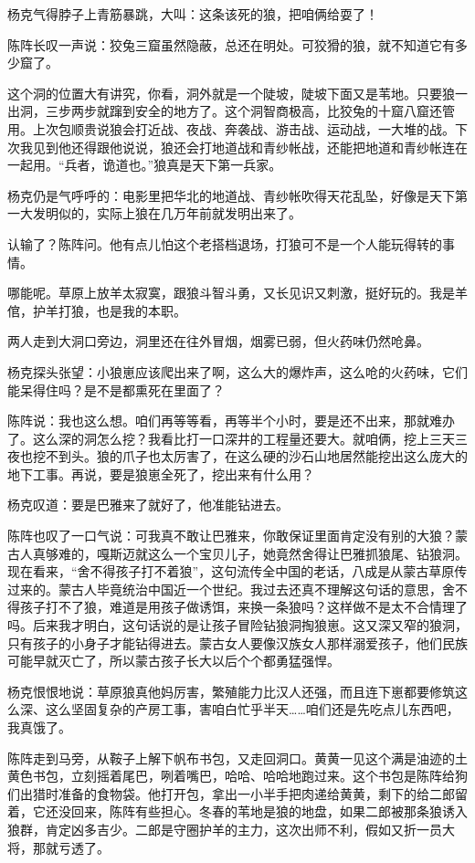 \par 杨克气得脖子上青筋暴跳，大叫：这条该死的狼，把咱俩给耍了！
\par 陈阵长叹一声说：狡兔三窟虽然隐蔽，总还在明处。可狡猾的狼，就不知道它有多少窟了。
\par 这个洞的位置大有讲究，你看，洞外就是一个陡坡，陡坡下面又是苇地。只要狼一出洞，三步两步就蹿到安全的地方了。这个洞智商极高，比狡兔的十窟八窟还管用。上次包顺贵说狼会打近战、夜战、奔袭战、游击战、运动战，一大堆的战。下次我见到他还得跟他说说，狼还会打地道战和青纱帐战，还能把地道和青纱帐连在一起用。“兵者，诡道也。”狼真是天下第一兵家。
\par 杨克仍是气呼呼的：电影里把华北的地道战、青纱帐吹得天花乱坠，好像是天下第一大发明似的，实际上狼在几万年前就发明出来了。
\par 认输了？陈阵问。他有点儿怕这个老搭档退场，打狼可不是一个人能玩得转的事情。
\par 哪能呢。草原上放羊太寂寞，跟狼斗智斗勇，又长见识又刺激，挺好玩的。我是羊倌，护羊打狼，也是我的本职。
\par 两人走到大洞口旁边，洞里还在往外冒烟，烟雾已弱，但火药味仍然呛鼻。
\par 杨克探头张望：小狼崽应该爬出来了啊，这么大的爆炸声，这么呛的火药味，它们能呆得住吗？是不是都熏死在里面了？
\par 陈阵说：我也这么想。咱们再等等看，再等半个小时，要是还不出来，那就难办了。这么深的洞怎么挖？我看比打一口深井的工程量还要大。就咱俩，挖上三天三夜也挖不到头。狼的爪子也太厉害了，在这么硬的沙石山地居然能挖出这么庞大的地下工事。再说，要是狼崽全死了，挖出来有什么用？
\par 杨克叹道：要是巴雅来了就好了，他准能钻进去。
\par 陈阵也叹了一口气说：可我真不敢让巴雅来，你敢保证里面肯定没有别的大狼？蒙古人真够难的，嘎斯迈就这么一个宝贝儿子，她竟然舍得让巴雅抓狼尾、钻狼洞。现在看来，“舍不得孩子打不着狼”，这句流传全中国的老话，八成是从蒙古草原传过来的。蒙古人毕竟统治中国近一个世纪。我过去还真不理解这句话的意思，舍不得孩子打不了狼，难道是用孩子做诱饵，来换一条狼吗？这样做不是太不合情理了吗。后来我才明白，这句话说的是让孩子冒险钻狼洞掏狼崽。这又深又窄的狼洞，只有孩子的小身子才能钻得进去。蒙古女人要像汉族女人那样溺爱孩子，他们民族可能早就灭亡了，所以蒙古孩子长大以后个个都勇猛强悍。
\par 杨克恨恨地说：草原狼真他妈厉害，繁殖能力比汉人还强，而且连下崽都要修筑这么深、这么坚固复杂的产房工事，害咱白忙乎半天……咱们还是先吃点儿东西吧，我真饿了。
\par 陈阵走到马旁，从鞍子上解下帆布书包，又走回洞口。黄黄一见这个满是油迹的土黄色书包，立刻摇着尾巴，咧着嘴巴，哈哈、哈哈地跑过来。这个书包是陈阵给狗们出猎时准备的食物袋。他打开包，拿出一小半手把肉递给黄黄，剩下的给二郎留着，它还没回来，陈阵有些担心。冬春的苇地是狼的地盘，如果二郎被那条狼诱入狼群，肯定凶多吉少。二郎是守圈护羊的主力，这次出师不利，假如又折一员大将，那就亏透了。
